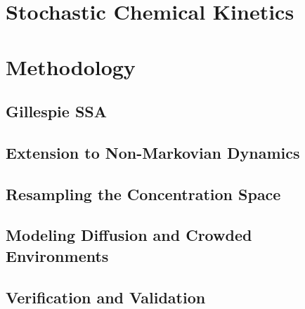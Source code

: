 \documentclass[english,letterpaper,12pt]{article}
\begin{document}
\begin{doublespacing}



\section{Stochastic Chemical Kinetics} %
\label{sec:chemkin}


\section{Methodology} %
\label{sec:methodology}

\subsection{Gillespie SSA} %
\label{sub:gillespie-ssa}


\subsection{Extension to Non-Markovian Dynamics} %
\label{sub:non-markovian}


\subsection{Resampling the Concentration Space} %
\label{sub:we-resampling-intro}


\subsection{Modeling Diffusion and Crowded Environments} %
\label{sub:diffusion-crowded}


\subsection{Verification and Validation} %
\label{sub:verification-validation}


\end{doublespacing}
\end{document}
